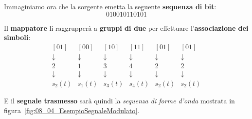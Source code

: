 Immaginiamo ora che la sorgente emetta la seguente \textbf{sequenza di bit}:
\[
    010010110101
\]

Il \textbf{mappatore} li raggrupperà a \textbf{gruppi di due} per 
effettuare l'\textbf{associazione dei simboli}:
\[
    \begin{matrix}
        [01] & [00] & [10] & [11] & [01] & [01] \\ 
        \downarrow &\downarrow &\downarrow &\downarrow &\downarrow &\downarrow \\ 
        2 & 1 & 3 & 4 & 2 & 2 \\ 
        \downarrow &\downarrow &\downarrow &\downarrow &\downarrow &\downarrow \\ 
        s_{2}(t) & s_{1}(t) & s_{3}(t) & s_{4}(t) & s_{2}(t) & s_{2}(t)
    \end{matrix}
\]

E il \textbf{segnale trasmesso} sarà quindi la \textit{sequenza di forme d'onda}
mostrata in figura~\ref{fig:08_04_EsempioSegnaleModulato}.

